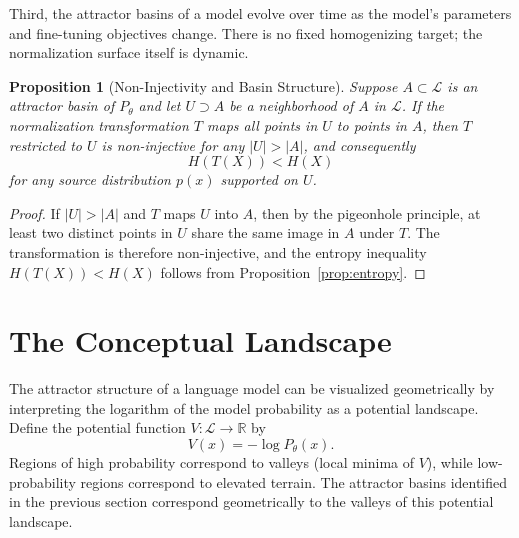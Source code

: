 \documentclass[12pt,a4paper]{article}
\theoremstyle{definition}
\theoremstyle{plain}
\newtheorem{proposition}[definition]{Proposition}
\theoremstyle{remark}
\newcommand{\calL}{\mathcal{L}}
\begin{document}
Third, the attractor basins of a model evolve over time as the model's parameters and
fine-tuning objectives change. There is no fixed homogenizing target; the normalization
surface itself is dynamic.

\begin{proposition}[Non-Injectivity and Basin Structure]
Suppose $A \subset \calL$ is an attractor basin of $P_\theta$ and let $U \supset A$ be a
neighborhood of $A$ in $\calL$. If the normalization transformation $T$ maps all points in
$U$ to points in $A$, then $T$ restricted to $U$ is non-injective for any $|U| > |A|$, and
consequently
\[
H(T(X)) < H(X)
\]
for any source distribution $p(x)$ supported on $U$.
\end{proposition}

\begin{proof}
If $|U| > |A|$ and $T$ maps $U$ into $A$, then by the pigeonhole principle, at least two
distinct points in $U$ share the same image in $A$ under $T$. The transformation is therefore
non-injective, and the entropy inequality $H(T(X)) < H(X)$ follows from
Proposition~\ref{prop:entropy}.
\end{proof}

\section{The Conceptual Landscape}
\label{sec:landscape}

The attractor structure of a language model can be visualized geometrically by interpreting
the logarithm of the model probability as a potential landscape. Define the potential function
$V : \calL \to \mathbb{R}$ by
\[
V(x) = -\log P_\theta(x).
\]
Regions of high probability correspond to valleys (local minima of $V$), while low-probability
regions correspond to elevated terrain. The attractor basins identified in the previous
section correspond geometrically to the valleys of this potential landscape.
\end{document}
